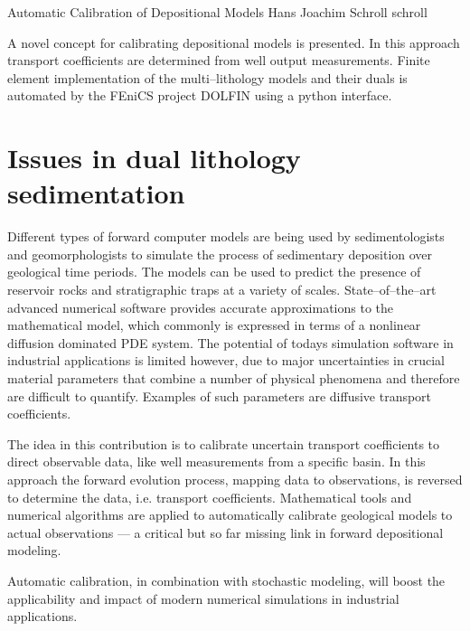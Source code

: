               {Automatic Calibration of Depositional Models}
              {Hans Joachim Schroll}
              {schroll}

A novel concept for calibrating depositional models is presented.
In this approach transport coefficients are determined from well output measurements.
Finite element implementation of the multi--lithology models and their duals is automated 
by the FEniCS project DOLFIN using a python interface.


\section{Issues in dual lithology sedimentation}

Different types of forward computer models are being used by sedimentologists and geomorphologists 
to simulate the process of sedimentary deposition over geological time periods. 
The models can be used to predict the presence of reservoir rocks and stratigraphic traps at a variety of scales. 
State--of--the--art advanced numerical software provides accurate approximations to the mathematical model, 
which commonly is expressed in terms of a nonlinear diffusion dominated PDE system. 
The potential of todays simulation software in industrial applications is limited however, 
due to major uncertainties in crucial material parameters that combine a number of physical phenomena 
and therefore are difficult to quantify. 
Examples of such parameters are diffusive transport coefficients.

The idea in this contribution is to calibrate uncertain transport coefficients to direct observable data, 
like well measurements from a specific basin. 
In this approach the forward evolution process, mapping data to observations, 
is reversed to determine the data, i.e. transport coefficients. 
Mathematical tools and numerical algorithms are applied 
to automatically calibrate geological models to actual observations ---
a critical but so far missing link in forward depositional modeling.

Automatic calibration, in combination with stochastic modeling, 
will boost the applicability and impact of modern numerical simulations in industrial applications.


